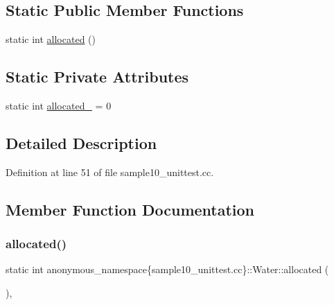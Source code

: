 \subsection*{Static Public Member Functions}
\begin{DoxyCompactItemize}
\item 
static int \hyperlink{classanonymous__namespace_02sample10__unittest_8cc_03_1_1Water_aa9c7c691e2b1c95aaf3da3652d7b21fc}{allocated} ()
\end{DoxyCompactItemize}
\subsection*{Static Private Attributes}
\begin{DoxyCompactItemize}
\item 
static int \hyperlink{classanonymous__namespace_02sample10__unittest_8cc_03_1_1Water_aca2af792049d025e9993fcae13dc7966}{allocated\+\_\+} = 0
\end{DoxyCompactItemize}


\subsection{Detailed Description}


Definition at line 51 of file sample10\+\_\+unittest.\+cc.



\subsection{Member Function Documentation}
\mbox{\label{classanonymous__namespace_02sample10__unittest_8cc_03_1_1Water_aa9c7c691e2b1c95aaf3da3652d7b21fc}} 
\subsubsection{\texorpdfstring{allocated()}{allocated()}}
{\footnotesize\ttfamily static int anonymous\+\_\+namespace\{sample10\+\_\+unittest.\+cc\}\+::Water\+::allocated (\begin{DoxyParamCaption}{ }\end{DoxyParamCaption})\hspace{0.3cm}{\ttfamily [inline]}, {\ttfamily [static]}}



